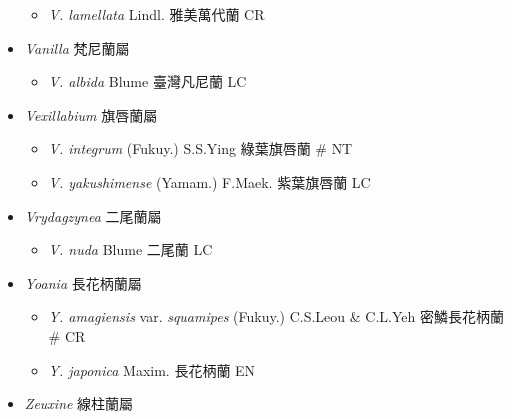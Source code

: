\begin{itemize}
  \begin{itemize}
        \item[] \textit{V. lamellata} Lindl.  雅美萬代蘭   CR
  \end{itemize}
 \item[] \textit{Vanilla} 梵尼蘭屬
                                
  \begin{itemize}
        \item[] \textit{V. albida} Blume  臺灣凡尼蘭   LC
  \end{itemize}
 \item[] \textit{Vexillabium} 旗唇蘭屬
                                
  \begin{itemize}
        \item[] \textit{V. integrum} (Fukuy.) S.S.Ying  綠葉旗唇蘭  \# NT
        \item[] \textit{V. yakushimense} (Yamam.) F.Maek.  紫葉旗唇蘭   LC
  \end{itemize}
 \item[] \textit{Vrydagzynea} 二尾蘭屬
                                
  \begin{itemize}
        \item[] \textit{V. nuda} Blume  二尾蘭   LC
  \end{itemize}
 \item[] \textit{Yoania} 長花柄蘭屬
                                
  \begin{itemize}
        \item[] \textit{Y. amagiensis} var. \textit{squamipes} (Fukuy.) C.S.Leou \& C.L.Yeh  密鱗長花柄蘭  \# CR
        \item[] \textit{Y. japonica} Maxim.  長花柄蘭   EN
  \end{itemize}
 \item[] \textit{Zeuxine} 線柱蘭屬
                                

\end{itemize}
